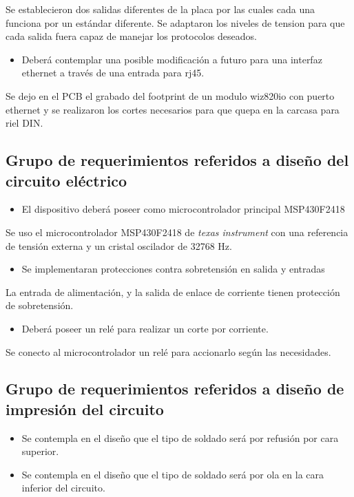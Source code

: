 Se establecieron dos salidas diferentes de la placa por las cuales cada una funciona por un estándar diferente. Se adaptaron los niveles de tension para que cada salida fuera capaz de manejar los protocolos deseados.

\begin{itemize}
\item Deberá contemplar una posible modificación a futuro para una interfaz ethernet a través de una entrada para rj45.
\end{itemize}

Se dejo en el PCB el grabado del footprint de un modulo wiz820io con puerto ethernet y se realizaron los cortes necesarios para que quepa en la carcasa para riel DIN.
 

\subsection{Grupo de requerimientos referidos a diseño del circuito eléctrico}
\begin{itemize}
\item El dispositivo deberá poseer como microcontrolador principal MSP430F2418
\end{itemize}

Se uso el microcontrolador MSP430F2418 de \textit{texas instrument} con una referencia de tensión externa y un cristal oscilador de 32768 Hz.

\begin{itemize}
\item Se implementaran protecciones contra sobretensión en salida y entradas
\end{itemize}

La entrada de alimentación, y la salida de enlace de corriente tienen protección de sobretensión. 

\begin{itemize}
\item Deberá poseer un relé para realizar un corte por corriente.
\end{itemize}

Se conecto al microcontrolador un relé para accionarlo según las necesidades.

 
\subsection{Grupo de requerimientos referidos a diseño  de impresión del circuito}
\begin{itemize}
\item Se contempla en el diseño que el tipo de soldado será por refusión por cara superior.

\item Se contempla en el diseño que el tipo de soldado será por ola en la cara inferior del circuito.
\end{itemize}

